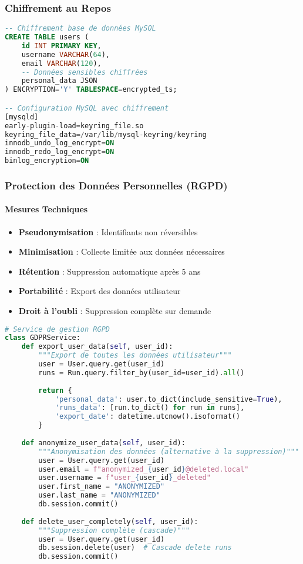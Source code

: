 \subsubsection{Chiffrement au Repos}

\begin{lstlisting}[language=sql]
-- Chiffrement base de données MySQL
CREATE TABLE users (
    id INT PRIMARY KEY,
    username VARCHAR(64),
    email VARCHAR(120),
    -- Données sensibles chiffrées
    personal_data JSON 
) ENCRYPTION='Y' TABLESPACE=encrypted_ts;

-- Configuration MySQL avec chiffrement
[mysqld]
early-plugin-load=keyring_file.so
keyring_file_data=/var/lib/mysql-keyring/keyring
innodb_undo_log_encrypt=ON
innodb_redo_log_encrypt=ON
binlog_encryption=ON
\end{lstlisting}

\subsubsection{Protection des Données Personnelles (RGPD)}

\paragraph{Mesures Techniques}
\begin{itemize}
    \item \textbf{Pseudonymisation} : Identifiants non réversibles
    \item \textbf{Minimisation} : Collecte limitée aux données nécessaires
    \item \textbf{Rétention} : Suppression automatique après 5 ans
    \item \textbf{Portabilité} : Export des données utilisateur
    \item \textbf{Droit à l'oubli} : Suppression complète sur demande
\end{itemize}

\begin{lstlisting}[language=python]
# Service de gestion RGPD
class GDPRService:
    def export_user_data(self, user_id):
        """Export de toutes les données utilisateur"""
        user = User.query.get(user_id)
        runs = Run.query.filter_by(user_id=user_id).all()
        
        return {
            'personal_data': user.to_dict(include_sensitive=True),
            'runs_data': [run.to_dict() for run in runs],
            'export_date': datetime.utcnow().isoformat()
        }
    
    def anonymize_user_data(self, user_id):
        """Anonymisation des données (alternative à la suppression)"""
        user = User.query.get(user_id)
        user.email = f"anonymized_{user_id}@deleted.local"
        user.username = f"user_{user_id}_deleted"
        user.first_name = "ANONYMIZED"
        user.last_name = "ANONYMIZED"
        db.session.commit()
    
    def delete_user_completely(self, user_id):
        """Suppression complète (cascade)"""
        user = User.query.get(user_id)
        db.session.delete(user)  # Cascade delete runs
        db.session.commit()
\end{lstlisting}

